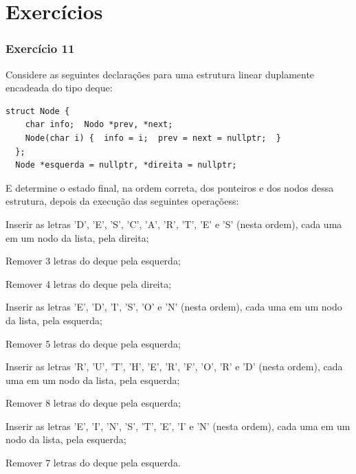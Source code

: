 \documentclass[aspectratio=169]{beamer}
\begin{document}
\section{Exercícios}

\begin{frame}[fragile]\frametitle{Exercício 11}
\begin{enumerate}
        \setcounter{enumi}{10}
{\footnotesize
	\item Considere as seguintes declarações para uma estrutura linear duplamente encadeada do tipo deque:
\begin{lstlisting}[basicstyle=\ttfamily\tiny]
  struct Node {
    char info;  Nodo *prev, *next;
    Node(char i) {  info = i;  prev = next = nullptr;  }
  };
  Node *esquerda = nullptr, *direita = nullptr;
\end{lstlisting}
E determine o estado final, na ordem correta, dos ponteiros e dos nodos dessa estrutura, depois da execução das seguintes operaçõess:
	\begin{itemize}
{\scriptsize
		\item Inserir as letras 'D', 'E', 'S', 'C', 'A', 'R', 'T', 'E' e 'S' (nesta ordem), cada uma em um nodo da lista, pela direita;
		\item Remover 3 letras do deque pela esquerda;
		\item Remover 4 letras do deque pela direita;
		\item Inserir as letras 'E', 'D', 'I', 'S', 'O' e 'N' (nesta ordem), cada uma em um nodo da lista, pela esquerda;
		\item Remover 5 letras do deque pela esquerda;
		\item Inserir as letras 'R', 'U', 'T', 'H', 'E', 'R', 'F', 'O', 'R' e 'D' (nesta ordem), cada uma em um nodo da lista, pela esquerda;
		\item Remover 8 letras do deque pela esquerda;
		\item Inserir as letras 'E', 'I', 'N', 'S', 'T', 'E', 'I' e 'N' (nesta ordem), cada uma em um nodo da lista, pela esquerda;
		\item Remover 7 letras do deque pela esquerda.
}
	\end{itemize}
}
\end{enumerate}
\end{frame}
\end{document}
